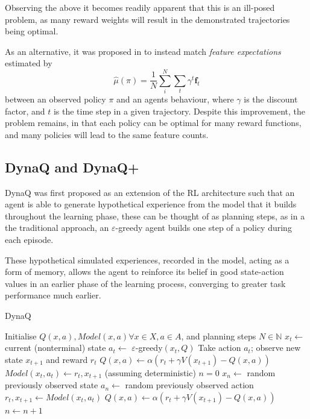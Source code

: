 \documentclass[10pt,technote]{IEEEtran}
\begin{document}
Observing the above it becomes readily apparent that this is an ill-posed problem, as many reward weights will result in the demonstrated trajectories being optimal.

As an alternative, it was proposed in \cite{abbeel2004apprenticeship} to instead match \emph{feature expectations} estimated by
\begin{equation}
\hat{\mu} (\pi) = \frac{1}{N} \sum_{i}^{N} \sum_{t} \gamma^t \textbf{f}_t
\end{equation}
between an observed policy $\pi$ and an agents behaviour, where $\gamma$ is the discount factor, and $t$ is the time step in a given trajectory. Despite this improvement, the problem remains, in that each policy can be optimal for many reward functions, and many policies will lead to the same feature counts.

\subsection{DynaQ and DynaQ+}

DynaQ \cite{sutton1991integrated} was first proposed as an extension of the RL architecture such that an agent is able to generate hypothetical experience from the model that it builds throughout the learning phase, these can be thought of as planning steps, as in a the traditional approach, an $\varepsilon$-greedy agent builds one step of a policy during each episode. 

These hypothetical simulated experiences, recorded in the model, acting as a form of memory, allows the agent to reinforce its belief in good state-action values in an earlier phase of the learning process, converging to greater task performance much earlier.

\begin{algorithm}
\caption{DynaQ}
\begin{algorithmic}[1]
\Require Initialise $Q(x,a),Model(x,a) \forall x \in X, a \in A$, and planning steps $N \in \mathbb{N}$ 
\State $x_t \leftarrow$ current (nonterminal) state
\State $a_t \leftarrow$ $\varepsilon$-greedy$(x_t,Q)$
\State Take action $a_t$; observe new state $x_{t+1}$ and reward $r_t$
\State $Q(x,a) \leftarrow \alpha \left(r_t + \gamma V(x_{t+1}) -  Q(x,a) \right)$
\State $Model(x_t,a_t) \leftarrow r_t, x_{t+1}$ (assuming deterministic)
\State $n=0$
\State $x_n \leftarrow$ random previously observed state
\State $a_n \leftarrow$ random previously observed action
\State $r_t, x_{t+1} \leftarrow Model(x_t,a_t)$
\State $Q(x,a) \leftarrow \alpha \left(r_t + \gamma V(x_{t+1}) -  Q(x,a) \right)$
\State $n \leftarrow n+1$
\EndWhile
\EndWhile
\end{algorithmic}
\label{alg:dynaq}
\end{algorithm}
\end{document}
